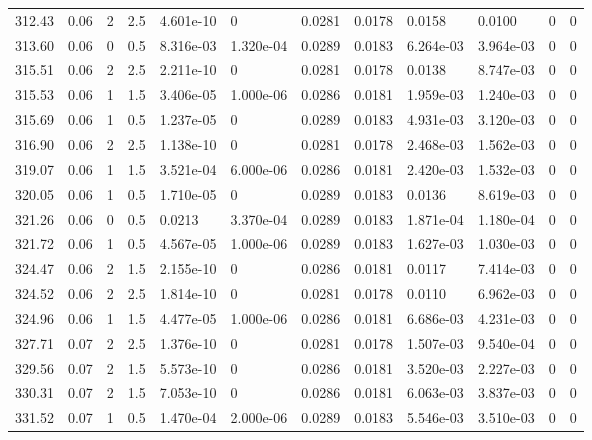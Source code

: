 \documentclass[preview]{standalone}
\begin{document}
{{{{{\begin{tabular}{L{1.2cm}C{1.2cm} C{0.3cm}C{0.5cm} C{1.4cm}C{1.4cm} C{1.4cm}C{1.4cm} C{1.6cm}C{1.6cm} C{1.6cm}C{1.6cm}}
  312.43  &  0.06  & 2     & 2.5 &  4.601e-10  & 0  &  0.0281&   0.0178& 0.0158 & 0.0100   &  0 & 0  \\ 
  313.60  &  0.06  & 0     & 0.5 &  8.316e-03  & 1.320e-04  &  0.0289&   0.0183& 6.264e-03 & 3.964e-03   &  0 & 0  \\ 
  315.51  &  0.06  & 2     & 2.5 &  2.211e-10  & 0  &  0.0281&   0.0178& 0.0138 & 8.747e-03   &  0 & 0  \\ 
  315.53  &  0.06  & 1     & 1.5 &  3.406e-05  & 1.000e-06  &  0.0286&   0.0181& 1.959e-03 & 1.240e-03   &  0 & 0  \\ 
  315.69  &  0.06  & 1     & 0.5 &  1.237e-05  & 0  &  0.0289&   0.0183& 4.931e-03 & 3.120e-03   &  0 & 0  \\ 
  316.90  &  0.06  & 2     & 2.5 &  1.138e-10  & 0  &  0.0281&   0.0178& 2.468e-03 & 1.562e-03   &  0 & 0  \\ 
  319.07  &  0.06  & 1     & 1.5 &  3.521e-04  & 6.000e-06  &  0.0286&   0.0181& 2.420e-03 & 1.532e-03   &  0 & 0  \\ 
  320.05  &  0.06  & 1     & 0.5 &  1.710e-05  & 0  &  0.0289&   0.0183& 0.0136 & 8.619e-03   &  0 & 0  \\ 
  321.26  &  0.06  & 0     & 0.5 &  0.0213  & 3.370e-04  &  0.0289&   0.0183& 1.871e-04 & 1.180e-04   &  0 & 0  \\ 
  321.72  &  0.06  & 1     & 0.5 &  4.567e-05  & 1.000e-06  &  0.0289&   0.0183& 1.627e-03 & 1.030e-03   &  0 & 0  \\ 
  324.47  &  0.06  & 2     & 1.5 &  2.155e-10  & 0  &  0.0286&   0.0181& 0.0117 & 7.414e-03   &  0 & 0  \\ 
  324.52  &  0.06  & 2     & 2.5 &  1.814e-10  & 0  &  0.0281&   0.0178& 0.0110 & 6.962e-03   &  0 & 0  \\ 
  324.96  &  0.06  & 1     & 1.5 &  4.477e-05  & 1.000e-06  &  0.0286&   0.0181& 6.686e-03 & 4.231e-03   &  0 & 0  \\ 
  327.71  &  0.07  & 2     & 2.5 &  1.376e-10  & 0  &  0.0281&   0.0178& 1.507e-03 & 9.540e-04   &  0 & 0  \\ 
  329.56  &  0.07  & 2     & 1.5 &  5.573e-10  & 0  &  0.0286&   0.0181& 3.520e-03 & 2.227e-03   &  0 & 0  \\ 
  330.31  &  0.07  & 2     & 1.5 &  7.053e-10  & 0  &  0.0286&   0.0181& 6.063e-03 & 3.837e-03   &  0 & 0  \\ 
  331.52  &  0.07  & 1     & 0.5 &  1.470e-04  & 2.000e-06  &  0.0289&   0.0183& 5.546e-03 & 3.510e-03   &  0 & 0  \\ 

\end{tabular}}}}}}
\end{document}
